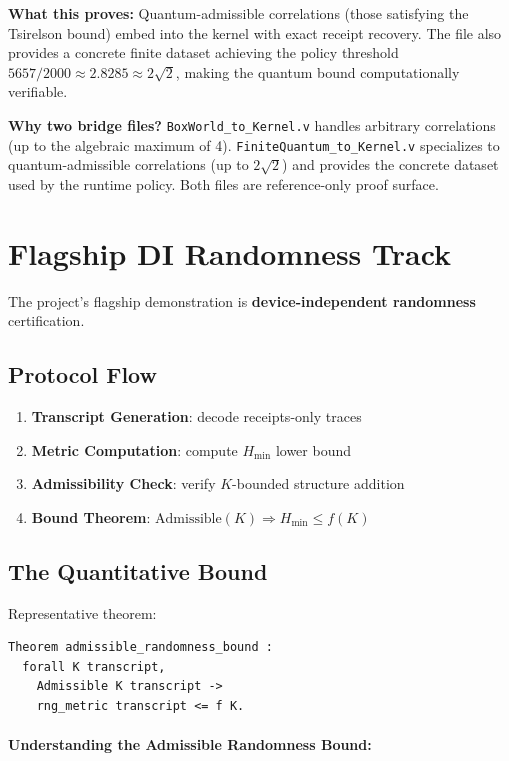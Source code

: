 \textbf{What this proves:} Quantum-admissible correlations (those satisfying the Tsirelson bound) embed into the kernel with exact receipt recovery. The file also provides a concrete finite dataset achieving the policy threshold $5657/2000 \approx 2.8285 \approx 2\sqrt{2}$, making the quantum bound computationally verifiable.

\textbf{Why two bridge files?} \texttt{BoxWorld\_to\_Kernel.v} handles arbitrary correlations (up to the algebraic maximum of 4). \texttt{FiniteQuantum\_to\_Kernel.v} specializes to quantum-admissible correlations (up to $2\sqrt{2}$) and provides the concrete dataset used by the runtime policy. Both files are reference-only proof surface.

\section{Flagship DI Randomness Track}

The project's flagship demonstration is \textbf{device-independent randomness} certification.

\subsection{Protocol Flow}

\begin{enumerate}
    \item \textbf{Transcript Generation}: decode receipts-only traces
    \item \textbf{Metric Computation}: compute $H_{\min}$ lower bound
    \item \textbf{Admissibility Check}: verify $K$-bounded structure addition
    \item \textbf{Bound Theorem}: $\text{Admissible}(K) \Rightarrow H_{\min} \le f(K)$
\end{enumerate}

\subsection{The Quantitative Bound}

Representative theorem:
\begin{lstlisting}
Theorem admissible_randomness_bound :
  forall K transcript,
    Admissible K transcript ->
    rng_metric transcript <= f K.
\end{lstlisting}

\paragraph{Understanding the Admissible Randomness Bound:}

